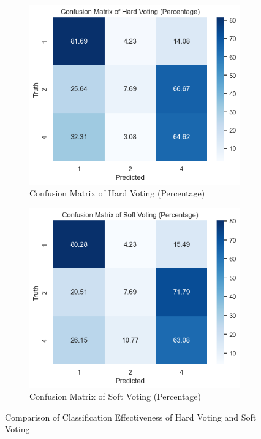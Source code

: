 \documentclass[journal]{IEEEtai}
\begin{document}
\begin{figure}[htbp]  
	\begin{subfigure}[b]{0.24\textwidth} %
		\centering  
		\includegraphics[width=\textwidth]{Confusion Matrix of Hard Voting.png}  
		\caption{Confusion Matrix of Hard Voting (Percentage)}  
	\end{subfigure}  
	\hfill %
	\begin{subfigure}[b]{0.24\textwidth}  
		\centering  
		\includegraphics[width=\textwidth]{Confusion Matrix of Soft Voting.png}  
		\caption{Confusion Matrix of Soft Voting (Percentage)}  
	\end{subfigure}  
	\caption{Comparison of Classification Effectiveness of Hard Voting and Soft Voting} %
\end{figure}
\end{document}
